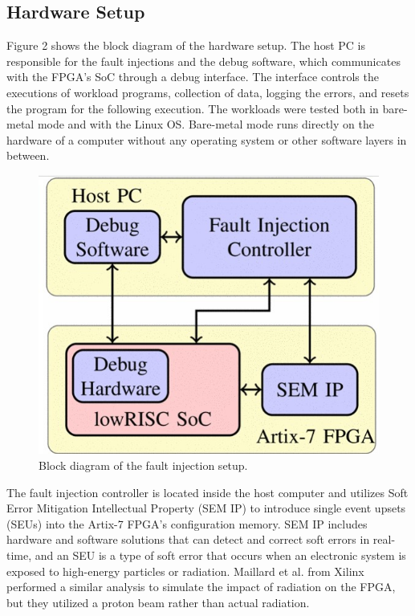 \documentclass[conference]{IEEEtran}
\begin{document}
\subsection{Hardware Setup}
Figure 2 shows the block diagram of the hardware setup. 
The host PC is responsible for the fault injections and the debug software, which communicates with the FPGA's SoC
through a debug interface. The interface controls the executions of workload programs, collection of data, logging the errors,
and resets the program for the following execution. The workloads were tested both in bare-metal mode and with the Linux OS. 
Bare-metal mode runs directly on the hardware of a computer without any operating system or other software layers in between. 
\begin{figure}[ht]
    \centering
    \includegraphics[scale = 0.5]{fault_inject.jpg}
    \caption{Block diagram of the fault injection setup.}
\end{figure}
The fault injection controller is located inside the host computer and utilizes Soft Error Mitigation Intellectual Property (SEM IP)
to introduce single event upsets (SEUs) into the Artix-7 FPGA's configuration memory. SEM IP includes hardware and software solutions 
that can detect and correct soft errors in real-time, and an SEU is a type of soft error that occurs when an electronic system is 
exposed to high-energy particles or radiation. Maillard et al. from Xilinx performed a similar analysis\cite{b3} to simulate the 
impact of radiation on the FPGA, but they utilized a proton beam rather than actual radiation.
\end{document}
